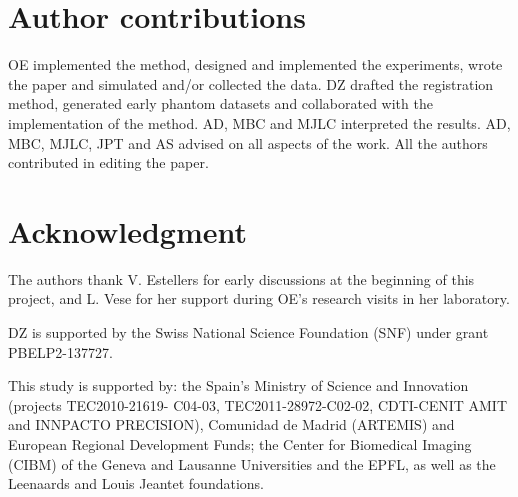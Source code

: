 \section*{Author contributions}
OE implemented the method, designed and implemented the experiments, wrote the paper and
  simulated and/or collected the data.
DZ drafted the registration method, generated early phantom datasets and collaborated with the
  implementation of the method.
AD, MBC and MJLC interpreted the results.
AD, MBC, MJLC, JPT and AS advised on all aspects of the work.
All the authors contributed in editing the paper.

\section*{Acknowledgment}
The authors thank V. Estellers for early discussions at the beginning of this project,
  and L. Vese for her support during OE's research visits in her laboratory.

DZ is supported by the Swiss National Science Foundation (SNF) under grant PBELP2-137727.

This study is supported by: the Spain's Ministry of Science and Innovation
(projects TEC2010-21619- C04-03, TEC2011-28972-C02-02, CDTI-CENIT
AMIT and INNPACTO PRECISION), Comunidad de Madrid (ARTEMIS) and
European Regional Development Funds; the Center for Biomedical Imaging
(CIBM) of the Geneva and Lausanne Universities and the EPFL, as well as the
Leenaards and Louis Jeantet foundations.
